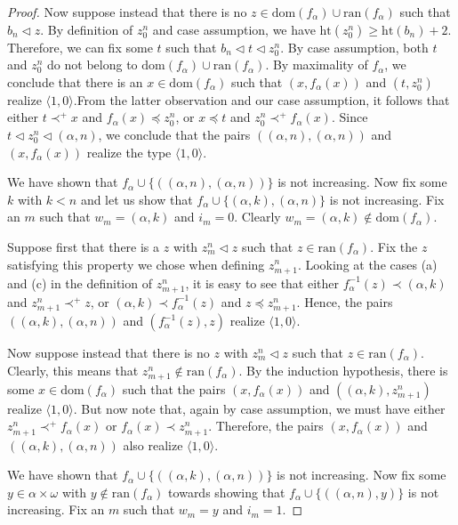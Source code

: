 \documentclass[10pt,a4paper]{amsart}
\begin{document}
\begin{proof}
Now suppose instead that there is no $z \in \mathrm{dom}(f_\alpha) \cup \mathrm{ran}(f_\alpha)$ such that $b_n \lhd z$. By definition of $z_0^n$ and case assumption, we have $\mathrm{ht}(z_0^n) \ge \mathrm{ht}(b_n)+2$. Therefore, we can fix some $t$ such that $b_n \lhd t \lhd z_0^n$. By case assumption, both $t$ and $z_0^n$ do not belong to $\mathrm{dom}(f_\alpha) \cup \mathrm{ran}(f_\alpha)$. By maximality of $f_\alpha$, we conclude that there is an $x \in \mathrm{dom}(f_\alpha)$ such that $(x, f_\alpha(x))$ and $(t, z_0^n)$ realize $\langle 1,0\rangle$.From the latter observation and our case assumption, it follows that either $t \prec^+ x$ and $f_\alpha(x) \preceq z_0^n$, or $x \preceq t$ and $z_0^n \prec^+ f_\alpha(x)$.
Since $t \lhd z_0^n \lhd (\alpha, n)$, we conclude that the pairs $((\alpha, n), (\alpha, n))$ and $(x, f_\alpha(x))$ realize the type $\langle 1,0\rangle$. 

We have shown that $f_\alpha \cup \{((\alpha, n), (\alpha, n))\}$ is not increasing. Now fix some $k$ with $k < n$ and let us show that $f_\alpha \cup \{(\alpha, k), (\alpha, n)\}$ is not increasing. Fix  an $m$ such that $w_m = (\alpha, k)$ and $i_m = 0$. Clearly $w_m = (\alpha, k) \not\in \mathrm{dom}(f_\alpha)$.

Suppose first that there is a $z$ with $z_m^n \lhd z$ such that $z \in \mathrm{ran}(f_\alpha)$. Fix the $z$ satisfying this property we chose when defining $z_{m+1}^n$. Looking at the cases (a) and (c) in the definition of $z_{m+1}^n$, it is easy to see that either $f_\alpha^{-1}(z) \prec (\alpha, k)$ and $z_{m+1}^n \prec^+ z$, or $(\alpha, k) \prec f_\alpha^{-1}(z)$ and $z \preceq z_{m+1}^n$. Hence, the pairs $((\alpha, k), (\alpha, n))$ and $(f_\alpha^{-1}(z), z)$ realize $\langle 1,0\rangle$. 

Now suppose instead that there is no $z$ with $z_m^n \lhd z$ such that $z \in \mathrm{ran}(f_\alpha)$. Clearly, this means that $z_{m+1}^n \not\in \mathrm{ran}(f_\alpha)$. By the induction hypothesis, there is some $x \in \mathrm{dom}(f_\alpha)$ such that the pairs $(x, f_\alpha(x))$ and $((\alpha, k), z_{m+1}^n)$ realize $\langle 1,0\rangle$. But now note that, again by case assumption, we must have either $z_{m+1}^n \prec^+ f_\alpha(x)$ or $f_\alpha(x) \prec z_{m+1}^n$. Therefore, the pairs $(x, f_\alpha(x))$ and $((\alpha, k), (\alpha, n))$ also realize $\langle 1,0\rangle$.

We have shown that $f_\alpha \cup \{((\alpha, k), (\alpha, n))\}$ is not increasing. Now fix some $y \in \alpha \times \omega$ with $y \not\in \mathrm{ran}(f_\alpha)$ towards showing that $f_\alpha \cup \{((\alpha, n), y)\}$ is not increasing. Fix an $m$ such that $w_m = y$ and $i_m = 1$. 


\end{proof}
\end{document}
